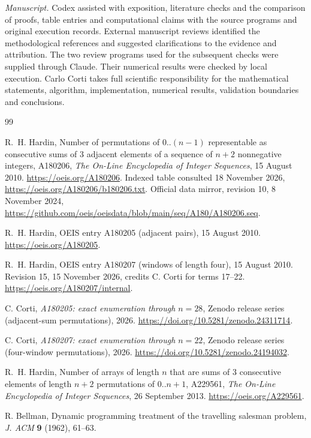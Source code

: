 \documentclass[11pt]{article}
\begin{document}
\noindent\textit{Manuscript.}
Codex assisted with exposition, literature checks and the comparison of
proofs, table entries and computational claims with the source programs
and original execution records. External manuscript reviews identified
the methodological references and suggested clarifications to the evidence
and attribution. The two review programs used for the subsequent checks
were supplied through Claude. Their numerical results were checked by
local execution. Carlo Corti takes full scientific
responsibility for the mathematical statements, algorithm, implementation,
numerical results, validation boundaries and conclusions.

\clearpage
\begin{thebibliography}{99}
\raggedright

R.~H. Hardin, Number of permutations of \(0..(n-1)\) representable as
consecutive sums of 3 adjacent elements of a sequence of \(n+2\)
nonnegative integers, A180206, \emph{The On-Line Encyclopedia of Integer
Sequences}, 15 August 2010. \url{https://oeis.org/A180206}.
Indexed table consulted 18 November 2026,
\url{https://oeis.org/A180206/b180206.txt}.
Official data mirror, revision 10, 8 November 2024,
\url{https://github.com/oeis/oeisdata/blob/main/seq/A180/A180206.seq}.

R.~H. Hardin, OEIS entry A180205 (adjacent pairs), 15 August 2010.
\url{https://oeis.org/A180205}.

R.~H. Hardin, OEIS entry A180207 (windows of length four), 15 August 2010.
Revision 15, 15 November 2026, credits C. Corti for terms 17--22.
\url{https://oeis.org/A180207/internal}.

C. Corti, \emph{A180205: exact enumeration through \(n=28\)},
Zenodo release series (adjacent-sum permutations), 2026.
\url{https://doi.org/10.5281/zenodo.24311714}.

C. Corti, \emph{A180207: exact enumeration through \(n=22\)},
Zenodo release series (four-window permutations), 2026.
\url{https://doi.org/10.5281/zenodo.24194032}.

R.~H. Hardin, Number of arrays of length \(n\) that are sums of 3
consecutive elements of length \(n+2\) permutations of \(0..n+1\), A229561, \emph{The On-Line Encyclopedia of Integer Sequences},
26 September 2013. \url{https://oeis.org/A229561}.

R. Bellman, Dynamic programming treatment of the travelling salesman
problem, \emph{J. ACM} \textbf{9} (1962), 61--63.


\end{thebibliography}
\end{document}

